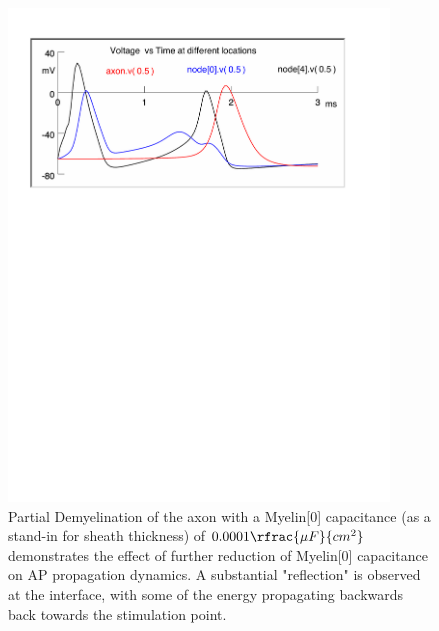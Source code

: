 \documentclass[12pt]{article}
\begin{document}
\begin{figure}[H]
\centering
\includegraphics[width=0.9\textwidth]{Results/4d-0001}
\caption{\label{fig:P4d2} Partial Demyelination of the axon with a Myelin[0] capacitance (as a stand-in for sheath thickness) of $0.0001 \rfrac{\mu F}{cm^{2}}$ demonstrates the effect of further reduction of Myelin[0] capacitance on AP propagation dynamics. A substantial "reflection" is observed at the interface, with some of the energy propagating backwards back towards the stimulation point.}
\end{figure}
\end{document}
